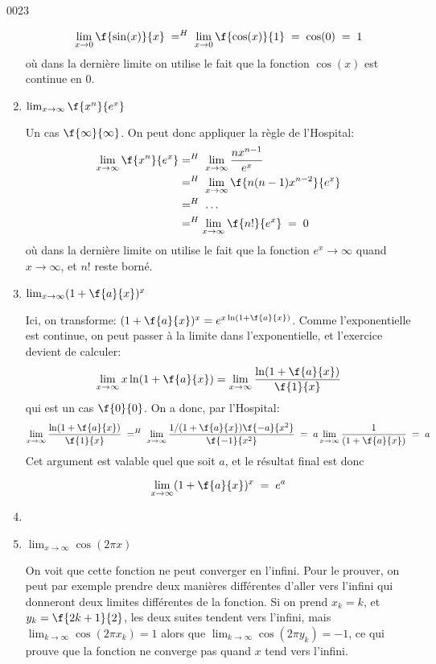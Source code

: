 \begin{corrige}{0023}
\begin{alternative}
\begin{enumerate}
		 \[\lim_{x\rightarrow 0}\f{\sin(x)}{x} \; =^{H}\; \lim_{x\rightarrow 0}\f{\cos(x)}{1}\;=\; \cos(0)\;=\;1\] o\`{u} dans la dernière limite on utilise le fait que la fonction $\cos(x)$ est continue en $0$.
		 
		 
		 \item $ \lim_{x\rightarrow \infty }\f{x^n}{e^x}$
		 
		Un cas $\f{\infty}{\infty}$. On peut donc appliquer la règle de l'Hospital:
	\begin{equation}
	\begin{aligned}[]
		\lim_{x\rightarrow \infty}\f{x^n}{e^x}&=^H\;  \lim_{x\rightarrow \infty}\frac{nx^{n-1}}{e^x}\\
			&=^H\;  \lim_{x\rightarrow \infty}\f{n(n-1)x^{n-2}}{e^x}\\
			&=^H\; \ldots\\
			&=^H\lim_{x\rightarrow \infty}\f{n!}{e^x}\;=\;0
	\end{aligned}
\end{equation}	 
		 où dans la dernière limite on utilise le fait que la fonction $e^x \rightarrow  \infty$ quand $x\rightarrow  \infty$, et $n!$ reste borné.
		 
		\item $ \lim_{x\rightarrow  \infty}(1+\f{a}{x})^x$ 
		 
		Ici, on transforme: $ (1+\f{a}{x})^x = e^{x\ln(1+\f{a}{x})}$. Comme l'exponentielle est continue, on peut passer à la limite dans l'exponentielle, et l'exercice devient de calculer:
		 \[\lim_{x\rightarrow  \infty}x\ln(1+\f{a}{x}) = \lim_{x\rightarrow  \infty}\dfrac{\ln(1+\f{a}{x})}{\f{1}{x}}\]
		qui est un cas $\f{0}{0}$. On a donc, par l'Hospital:
		  \[\lim_{x\rightarrow  \infty}\dfrac{\ln(1+\f{a}{x})}{\f{1}{x}} \; =^H\;   \lim_{x\rightarrow  \infty}\dfrac{1/(1+\f{a}{x})\f{-a}{x^2}}{\f{-1}{x^2}} \; = \;      a\lim_{x\rightarrow  \infty}\dfrac{1}{(1+\f{a}{x})}   \;=\; a       \]
		Cet argument est valable quel que soit $a$, et le résultat final est donc  
		 
		 \[ \lim_{x\rightarrow  \infty}(1+\f{a}{x})^x \;= \; e^a\] 
		 
		\item

		 \item $\lim_{x\rightarrow \infty} \cos(2\pi x)$
		 
		 On voit que cette fonction ne peut converger en l'infini. Pour le prouver, on peut par exemple prendre deux manières différentes d'aller vers l'infini qui donneront deux limites différentes de la fonction. 
		Si on prend $x_k=k$, et $y_k = \f{2k+1}{2}$, les deux suites tendent vers l'infini, mais  
		 $\lim_{k\rightarrow \infty} \cos(2\pi x_k) = 1$ alors que $\lim_{k\rightarrow \infty} \cos(2\pi y_k) =  -1$, ce qui prouve que la fonction ne converge pas quand $x$ tend vers l'infini.
		 

\end{enumerate}
\end{alternative}
\end{corrige}
